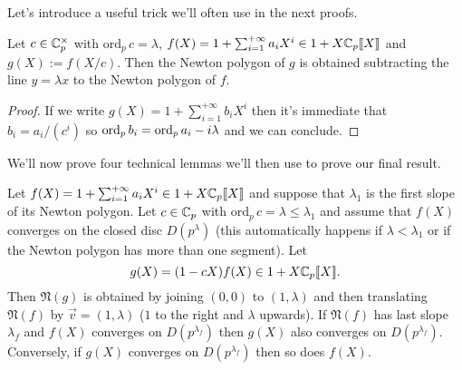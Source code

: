 		Let's introduce a useful trick we'll often use in the next proofs.
		\begin{lemma}
			\label{lemma:newton-polygon-translation}
			Let $c \in \mathbb{C}_p^\times$ with $\mathrm{ord}_p\, c = \lambda$, $f(X) = 1 + \sum_{i=1}^{+\infty} a_iX^i \in 1 + X\mathbb{C}_p\llbracket {X} \rrbracket$ and $g(X) := f\left(X/c\right)$. Then the Newton polygon of $g$ is obtained subtracting the line $y = \lambda x$ to the Newton polygon of $f$.
		\end{lemma}
		\begin{proof}
			If we write $g(X) = 1 + \sum_{i=1}^{+\infty} b_iX^i$ then it's immediate that $b_i = a_i/\left(c^i\right)$ so $\textrm{ord}_p\, b_i = \textrm{ord}_p\, a_i - i\lambda$ and we can conclude.
		\end{proof}
		We'll now prove four technical lemmas we'll then use to prove our final result.
		\begin{lemma}
			\label{lemma:lemma6-p.102}
			Let $f(X) = 1 + \sum_{i=1}^{+\infty} a_iX^i \in 1 + X\mathbb{C}_p\llbracket {X} \rrbracket$ and suppose that $\lambda_1$ is the first slope of its Newton polygon. Let $c \in \mathbb{C}_p$ with $\mathrm{ord}_p\,c = \lambda \leq \lambda_1$ and assume that $f(X)$ converges on the closed disc $D(p^{\lambda})$ (this automatically happens if $\lambda < \lambda_1$ or if the Newton polygon has more than one segment). Let 
			\[
				g(X) = (1 - cX)f(X) \in 1 + X\mathbb{C}_p\llbracket {X} \rrbracket.
			\]
			Then $\mathfrak{N}(g)$ is obtained by joining $(0,0)$ to $(1, \lambda)$ and then translating $\mathfrak{N}(f)$ by $\vec{v} = (1, \lambda)$ ($1$ to the right and $\lambda$ upwards). If $\mathfrak{N}(f)$ has last slope $\lambda_f$ and $f(X)$ converges on $D(p^{\lambda_f})$ then $g(X)$ also converges on $D(p^{\lambda_f})$. Conversely, if $g(X)$ converges on $D(p^{\lambda_f})$ then so does $f(X)$.
		\end{lemma}
